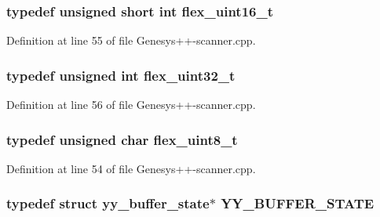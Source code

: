 \hypertarget{_genesys_09_09-scanner_8cpp_ac50cdb9eefbef83a1cec89e3a7f6e1d2}{
\subsubsection[{flex\-\_\-uint16\-\_\-t}]{\setlength{\rightskip}{0pt plus 5cm}typedef unsigned short int {\bf flex\-\_\-uint16\-\_\-t}}}\label{_genesys_09_09-scanner_8cpp_ac50cdb9eefbef83a1cec89e3a7f6e1d2}


Definition at line 55 of file Genesys++-\/scanner.\-cpp.

\hypertarget{_genesys_09_09-scanner_8cpp_a36869712de12820c73aae736762e8e88}{
\subsubsection[{flex\-\_\-uint32\-\_\-t}]{\setlength{\rightskip}{0pt plus 5cm}typedef unsigned int {\bf flex\-\_\-uint32\-\_\-t}}}\label{_genesys_09_09-scanner_8cpp_a36869712de12820c73aae736762e8e88}


Definition at line 56 of file Genesys++-\/scanner.\-cpp.

\hypertarget{_genesys_09_09-scanner_8cpp_a0fac5ea484f64e75dbe6eba4aa61750c}{
\subsubsection[{flex\-\_\-uint8\-\_\-t}]{\setlength{\rightskip}{0pt plus 5cm}typedef unsigned char {\bf flex\-\_\-uint8\-\_\-t}}}\label{_genesys_09_09-scanner_8cpp_a0fac5ea484f64e75dbe6eba4aa61750c}


Definition at line 54 of file Genesys++-\/scanner.\-cpp.

\hypertarget{_genesys_09_09-scanner_8cpp_a4e5bd2d129903df83f3d13effaf8f3e4}{
\subsubsection[{Y\-Y\-\_\-\-B\-U\-F\-F\-E\-R\-\_\-\-S\-T\-A\-T\-E}]{\setlength{\rightskip}{0pt plus 5cm}typedef struct {\bf yy\-\_\-buffer\-\_\-state}$\ast$ {\bf Y\-Y\-\_\-\-B\-U\-F\-F\-E\-R\-\_\-\-S\-T\-A\-T\-E}}}\label{_genesys_09_09-scanner_8cpp_a4e5bd2d129903df83f3d13effaf8f3e4}


